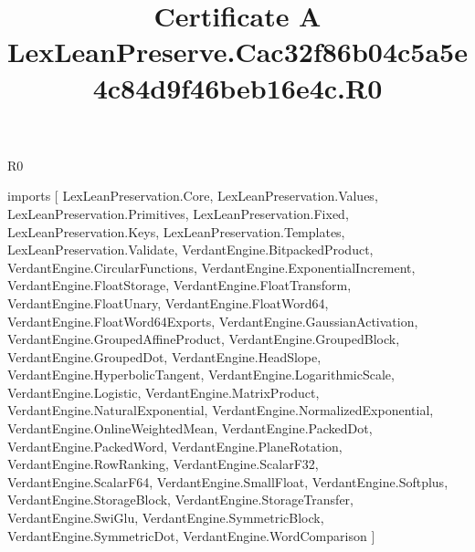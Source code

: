 \begin{lexlean}{R0}
\title{Certificate A LexLeanPreserve.Cac32f86b04c5a5e4c84d9f46beb16e4c.R0}
\begin{coremodule}
imports [
  LexLeanPreservation.Core,
  LexLeanPreservation.Values,
  LexLeanPreservation.Primitives,
  LexLeanPreservation.Fixed,
  LexLeanPreservation.Keys,
  LexLeanPreservation.Templates,
  LexLeanPreservation.Validate,
  VerdantEngine.BitpackedProduct,
  VerdantEngine.CircularFunctions,
  VerdantEngine.ExponentialIncrement,
  VerdantEngine.FloatStorage,
  VerdantEngine.FloatTransform,
  VerdantEngine.FloatUnary,
  VerdantEngine.FloatWord64,
  VerdantEngine.FloatWord64Exports,
  VerdantEngine.GaussianActivation,
  VerdantEngine.GroupedAffineProduct,
  VerdantEngine.GroupedBlock,
  VerdantEngine.GroupedDot,
  VerdantEngine.HeadSlope,
  VerdantEngine.HyperbolicTangent,
  VerdantEngine.LogarithmicScale,
  VerdantEngine.Logistic,
  VerdantEngine.MatrixProduct,
  VerdantEngine.NaturalExponential,
  VerdantEngine.NormalizedExponential,
  VerdantEngine.OnlineWeightedMean,
  VerdantEngine.PackedDot,
  VerdantEngine.PackedWord,
  VerdantEngine.PlaneRotation,
  VerdantEngine.RowRanking,
  VerdantEngine.ScalarF32,
  VerdantEngine.ScalarF64,
  VerdantEngine.SmallFloat,
  VerdantEngine.Softplus,
  VerdantEngine.StorageBlock,
  VerdantEngine.StorageTransfer,
  VerdantEngine.SwiGlu,
  VerdantEngine.SymmetricBlock,
  VerdantEngine.SymmetricDot,
  VerdantEngine.WordComparison
]


\end{coremodule}
\end{lexlean}
